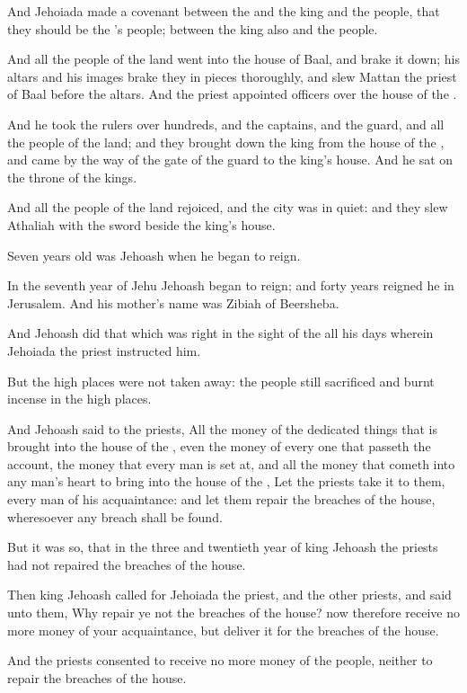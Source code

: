 \Verse And Jehoiada made a covenant between the \LORD and the king and the people, that they should be the \LORD's people; between the king also and the people.

\Verse And all the people of the land went into the house of Baal, and brake it down; his altars and his images brake they in pieces thoroughly, and slew Mattan the priest of Baal before the altars. And the priest appointed officers over the house of the \LORD.

\Verse And he took the rulers over hundreds, and the captains, and the guard, and all the people of the land; and they brought down the king from the house of the \LORD, and came by the way of the gate of the guard to the king's house. And he sat on the throne of the kings.

\Verse And all the people of the land rejoiced, and the city was in quiet: and they slew Athaliah with the sword beside the king's house.

\Verse Seven years old was Jehoash when he began to reign.


\Chapter
\Verse In the seventh year of Jehu Jehoash began to reign; and forty years reigned he in Jerusalem. And his mother's name was Zibiah of Beersheba.

\Verse And Jehoash did that which was right in the sight of the \LORD all his days wherein Jehoiada the priest instructed him.

\Verse But the high places were not taken away: the people still sacrificed and burnt incense in the high places.

\Verse And Jehoash said to the priests, All the money of the dedicated things that is brought into the house of the \LORD, even the money of every one that passeth the account, the money that every man is set at, and all the money that cometh into any man's heart to bring into the house of the \LORD, \Verse Let the priests take it to them, every man of his acquaintance: and let them repair the breaches of the house, wheresoever any breach shall be found.

\Verse But it was so, that in the three and twentieth year of king Jehoash the priests had not repaired the breaches of the house.

\Verse Then king Jehoash called for Jehoiada the priest, and the other priests, and said unto them, Why repair ye not the breaches of the house? now therefore receive no more money of your acquaintance, but deliver it for the breaches of the house.

\Verse And the priests consented to receive no more money of the people, neither to repair the breaches of the house.

